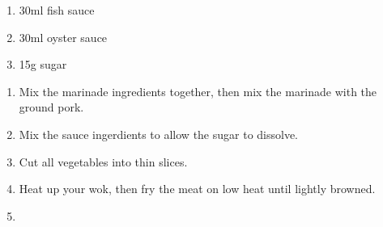 \begin{enumerate}
  \item 30ml fish sauce
  \item 30ml oyster sauce
  \item 15g sugar
\end{enumerate}

\begin{enumerate}
  \item Mix the marinade ingredients together, then mix the marinade with the
  ground pork.
  \item Mix the sauce ingerdients to allow the sugar to dissolve.
  \item Cut all vegetables into thin slices.
  \item Heat up your wok, then fry the meat on low heat until lightly browned.
  \item
\end{enumerate}
